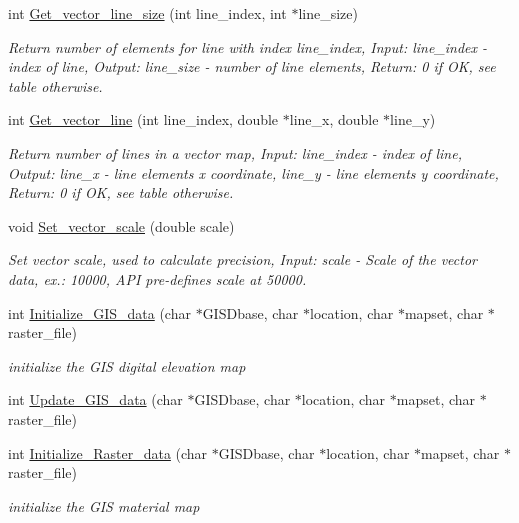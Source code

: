 \begin{CompactItemize}
int \hyperlink{GisApi_8C_a29}{Get\_\-vector\_\-line\_\-size} (int line\_\-index, int $\ast$line\_\-size)
\begin{CompactList}\small\item\em Return number of elements for line with index line\_\-index, Input: line\_\-index - index of line, Output: line\_\-size - number of line elements, Return: 0 if OK, see table otherwise. \item\end{CompactList}\item 
int \hyperlink{GisApi_8C_a30}{Get\_\-vector\_\-line} (int line\_\-index, double $\ast$line\_\-x, double $\ast$line\_\-y)
\begin{CompactList}\small\item\em Return number of lines in a vector map, Input: line\_\-index - index of line, Output: line\_\-x - line elements x coordinate, line\_\-y - line elements y coordinate, Return: 0 if OK, see table otherwise. \item\end{CompactList}\item 
void \hyperlink{GisApi_8C_a31}{Set\_\-vector\_\-scale} (double scale)
\begin{CompactList}\small\item\em Set vector scale, used to calculate precision, Input: scale - Scale of the vector data, ex.: 10000, API pre-defines scale at 50000. \item\end{CompactList}\item 
int \hyperlink{GisApi_8C_a32}{Initialize\_\-GIS\_\-data} (char $\ast$GISDbase, char $\ast$location, char $\ast$mapset, char $\ast$raster\_\-file)
\begin{CompactList}\small\item\em initialize the GIS digital elevation map \item\end{CompactList}\item 
int \hyperlink{GisApi_8C_a33}{Update\_\-GIS\_\-data} (char $\ast$GISDbase, char $\ast$location, char $\ast$mapset, char $\ast$raster\_\-file)
\item 
int \hyperlink{GisApi_8C_a34}{Initialize\_\-Raster\_\-data} (char $\ast$GISDbase, char $\ast$location, char $\ast$mapset, char $\ast$raster\_\-file)
\begin{CompactList}\small\item\em initialize the GIS material map \item\end{CompactList}\item 

\end{CompactItemize}
